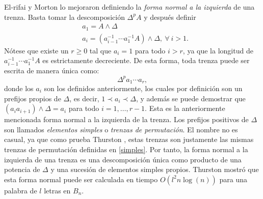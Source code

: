 \documentclass[bibtex, anon]{TEMat-article}
\begin{document}
El-rifai y Morton \cite{EM} lo mejoraron definiendo la \emph{forma normal a la izquierda} de una trenza. Basta tomar la descomposición $\Delta^pA$ y después definir %
\begin{align*}
&a_1=A\land\Delta\\
&a_i=(a_{i-1}^{-1}\cdots a_1^{-1}A)\land\Delta,\ \forall\ i>1.
\end{align*}
Nótese que existe un $r\geq 0$ tal que $a_i=1$ para todo $i>r$, ya que la longitud de $a_{i-1}^{-1}\cdots a_1^{-1}A$ es estrictamente decreciente. De esta forma, toda trenza puede ser escrita de manera única como:
$$\Delta^p a_1\cdots a_r,$$
donde los $a_i$ son los definidos anteriormente, los cuales por definición son un prefijos propios de $\Delta$, es decir, $1\prec a_i\prec\Delta$, y además se puede demostrar que $(a_ia_{i+1})\land\Delta=a_i$ \cite{Thurston} para todo $i=1,\dots, r-1$. Esta es la anteriormente mencionada forma normal a la izquierda de la trenza. Los prefijos positivos de $\Delta$ son llamados \emph{elementos simples} o \emph{trenzas de permutación}. El nombre no es casual, ya que como prueba Thurston \cite{Thurston}, estas trenzas son justamente las mismas trenzas de permutación definidas en \ref{simples}. Por tanto, la forma normal a la izquierda de una trenza es una descomposición única como producto de una potencia de $\Delta$ y una sucesión de elementos simples propios. Thurston \cite{Thurston} mostró que esta forma normal puede ser calculada en tiempo $O(l^2n\log(n))$ para una palabra de $l$ letras en $B_n$. 

\end{document}

